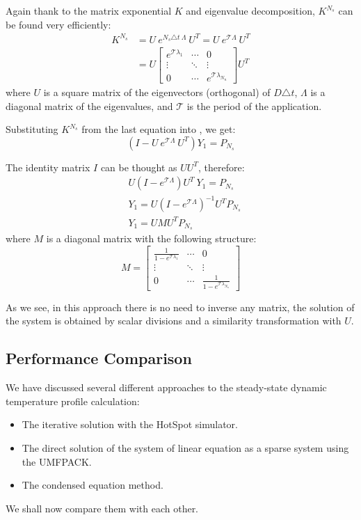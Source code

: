 Again thank to the matrix exponential $K$ and eigenvalue decomposition, $K^{N_s}$ can be found very efficiently:
\begin{align*}
  K^{N_s} & = U \: e^{N_s \triangle t \: \Lambda} \: U^T = U \: e^{\mathcal{T} \Lambda} \: U^T \\
    & = U \left[
      \begin{array}{ccc}
        e^{\mathcal{T} \lambda_1} & \cdots & 0 \\
        \vdots & \ddots & \vdots \\
        0 & \cdots & e^{\mathcal{T} \lambda_{N_n}}
      \end{array}
    \right] U^T
\end{align*}
where $U$ is a square matrix of the eigenvectors (orthogonal) of $D \triangle t$, $\Lambda$ is a diagonal matrix of the eigenvalues, and $\mathcal{T}$ is the period of the application.

Substituting $K^{N_s}$ from the last equation into , we get:
\[
  (I - U \: e^{\mathcal{T} \Lambda} \: U^T) Y_1 = P_{N_s}
\]

The identity matrix $I$ can be thought as $U U^T$, therefore:
\begin{align*}
  & U (I - e^{\mathcal{T} \Lambda}) U^T \: Y_1 = P_{N_s} \\
  & Y_1 = U (I - e^{\mathcal{T} \Lambda})^{-1} U^T P_{N_s} \\
  & Y_1 = U M U^T P_{N_s}
\end{align*}
where $M$ is a diagonal matrix with the following structure:
\[
  M = \left[
    \begin{array}{ccc}
      \frac{1}{1 - e^{\mathcal{T} \lambda_1}} & \cdots & 0 \\
      \vdots & \ddots & \vdots \\
      0 & \cdots & \frac{1}{1 - e^{\mathcal{T} \lambda_{N_n}}}
    \end{array}
  \right]
\]

As we see, in this approach there is no need to inverse any matrix, the solution of the system is obtained by scalar divisions and a similarity transformation with $U$.

\subsection{Performance Comparison}
We have discussed several different approaches to the steady-state dynamic temperature profile calculation:
\begin{itemize}
  \item The iterative solution with the HotSpot simulator.
  \item The direct solution of the system of linear equation as a sparse system using the UMFPACK.
  \item The condensed equation method.
\end{itemize}

We shall now compare them with each other.
